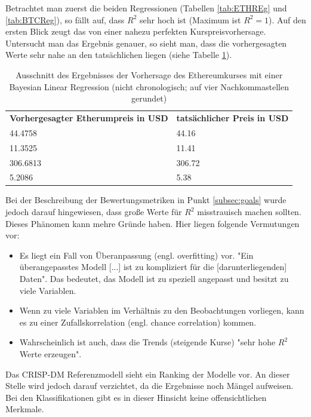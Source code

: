 Betrachtet man zuerst die beiden Regressionen (Tabellen \ref{tab:ETHREg} und \ref{tab:BTCReg}), so fällt auf, dass $ R^2 $ sehr hoch ist (Maximum ist $ R^2 = 1 $). Auf den ersten Blick zeugt das von einer nahezu perfekten Kurspreisvorhersage. Untersucht man das Ergebnis genauer, so sieht man, dass die vorhergesagten Werte sehr nahe an den tatsächlichen liegen (siehe Tabelle \ref{tab:scoredReal}).
\begin{table}[H]
\centering
\begin{tabular}{|p{4cm}|p{4cm}|}
\hline
\textbf{Vorhergesagter Etherumpreis in USD} & \textbf{tatsächlicher Preis in USD}\\ 
\hhline{==}
44.4758 & 44.16 \\ \hline
11.3525 & 11.41 \\ \hline
306.6813 & 306.72 \\ \hline
5.2086 & 5.38 \\ \hline
\end{tabular}
\caption{Ausschnitt des Ergebnisses der Vorhersage des Ethereumkurses mit einer Bayesian Linear Regression (nicht chronologisch; auf vier Nachkommastellen gerundet)}
\label{tab:scoredReal}
\end{table}
Bei der Beschreibung der Bewertungsmetriken in Punkt \ref{subsec:goals} wurde jedoch darauf hingewiesen, dass große Werte für $ R^2 $ misstrauisch machen sollten. Dieses Phänomen kann mehre Gründe haben. Hier liegen folgende Vermutungen vor:
\begin{itemize}
\item Es liegt ein Fall von Überanpassung (engl. overfitting) vor. "Ein überangepasstes Modell [...] ist zu kompliziert für die [darunterliegenden] Daten"\citep[eigene Übersetzung]{frost_danger_2015}. Das bedeutet, das Modell ist zu speziell angepasst und besitzt zu viele Variablen.
\item Wenn zu viele Variablen im Verhältnis zu den Beobachtungen vorliegen, kann es zu einer Zufallskorrelation (engl. chance correlation) kommen.\citep{lohninger_teach/me_1999}
\item Wahrscheinlich ist auch, dass die Trends (steigende Kurse) "sehr hohe $ R^2 $ Werte erzeugen".\citep[eigene Übersetzung]{frost_five_2016}
\end{itemize}
Das CRISP-DM Referenzmodell sieht ein Ranking der Modelle vor. An dieser Stelle wird jedoch darauf verzichtet, da die Ergebnisse noch Mängel aufweisen.
Bei den Klassifikationen gibt es in dieser Hinsicht keine offensichtlichen Merkmale.\newline 
